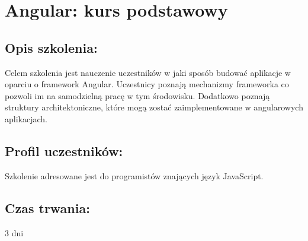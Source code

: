 \documentclass{article}[10pt]
\begin{document}
\newpage


    
	\section{Angular: kurs podstawowy}

	\subsection*{Opis szkolenia:}
	\begin{adjustwidth}{2cm}{}
\justifying
		
Celem szkolenia jest nauczenie uczestników w jaki sposób budować aplikacje w oparciu o framework Angular. Uczestnicy poznają mechanizmy frameworka co pozwoli im na samodzielną pracę w tym środowisku. Dodatkowo poznają struktury architektoniczne, które mogą zostać zaimplementowane w angularowych aplikacjach. 

	\end{adjustwidth}
	\subsection*{Profil uczestników:}
\begin{adjustwidth}{2cm}{}
\justifying
	
Szkolenie adresowane jest do programistów znających język JavaScript.
\end{adjustwidth}
	\subsection*{Czas trwania:}
\begin{adjustwidth}{2cm}{}
	3 dni
\end{adjustwidth}
\end{document}
